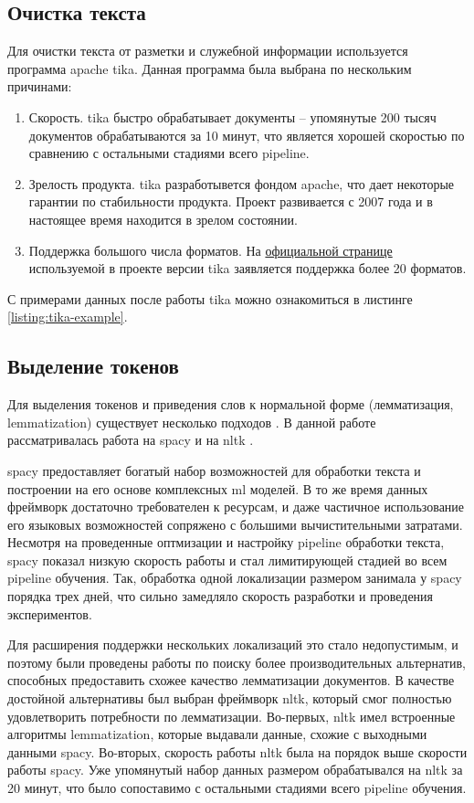 \subsection{Очистка текста}
Для очистки текста от разметки и служебной информации используется программа \gls{apache} \gls{tika}.
Данная программа была выбрана по нескольким причинами:
\begin{enumerate}
    \item Скорость.
        \Gls{tika} быстро обрабатывает документы -- упомянутые 200 тысяч документов обрабатываются за 10 минут, что является хорошей скоростью по сравнению с остальными стадиями всего \gls{pipeline}.
    \item Зрелость продукта.
        \Gls{tika} разработывется фондом \Gls{apache}, что дает некоторые гарантии по стабильности продукта.
        Проект развивается с 2007 года и в настоящее время находится в зрелом состоянии.
    \item Поддержка большого числа форматов.
        На \href{https://tika.apache.org/1.10/formats.html}{официальной странице} используемой в проекте версии \gls{tika} заявляется поддержка более 20 форматов.
\end{enumerate}
С примерами данных после работы \Gls{tika} можно ознакомиться в листинге \ref{listing:tika-example}.
\subsection{Выделение токенов}
Для выделения токенов и приведения слов к нормальной форме (лемматизация, \gls{lemmatization}) существует несколько подходов \cite{cite:lemmatization-review}.
В данной работе рассматривалась работа на \gls{spacy} \cite{cite:spacy} и на \gls{nltk} \cite{cite:nltk}.

\gls{spacy} предоставляет богатый набор возможностей для обработки текста и построении на его основе комплексных \acrshort{ml} моделей.
В то же время данных фреймворк достаточно требователен к ресурсам, и даже частичное использование его языковых возможностей сопряжено с большими вычистительными затратами.
Несмотря на проведенные оптмизации и настройку \gls{pipeline} обработки текста, \gls{spacy} показал низкую скорость работы и стал лимитирующей стадией во всем \gls{pipeline} обучения.
Так, обработка одной локализации размером \datasetSize занимала у \gls{spacy} порядка трех дней, что сильно замедляло скорость разработки и проведения экспериментов.

Для расширения поддержки нескольких локализаций это стало недопустимым, и поэтому были проведены работы по поиску более производительных альтернатив, способных предоставить схожее качество лемматизации документов.
В качестве достойной альтернативы был выбран фреймворк \gls{nltk}, который смог полностью удовлетворить потребности по лемматизации.
Во-первых, \gls{nltk} имел встроенные алгоритмы \gls{lemmatization}, которые выдавали данные, схожие с выходными данными \gls{spacy}.
Во-вторых, скорость работы \gls{nltk} была на порядок выше скорости работы \gls{spacy}.
Уже упомянутый набор данных размером \datasetSize обрабатывался на \gls{nltk} за 20 минут, что было сопоставимо с остальными стадиями всего \gls{pipeline} обучения.

